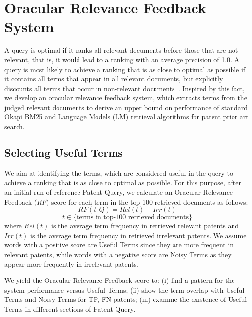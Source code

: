 \section{Oracular Relevance Feedback System}
\label{sec:oraculrquery}
A query is optimal if it ranks all relevant documents before
those that are not relevant, that is, it would lead to a ranking with an average precision of 1.0. A query
is most likely to achieve a ranking that is as close to optimal as possible if it contains all terms that
appear in all relevant documents, but explicitly discounts all terms that occur in non-relevant documents~\citep{manning2008introduction}.
Inspired by this fact, we develop an oracular relevance feedback system, which
extracts terms from the judged relevant documents to derive an upper bound on performance of
standard Okapi BM25 and Language Models (LM) retrieval
algorithms for patent prior art search.
\subsection{Selecting Useful Terms}
\label{OracularTermSelection}
We aim at identifying the terms, which are considered useful in the query to achieve a ranking that is as close to optimal as possible. For this purpose, 
after an initial run of reference Patent Query, we
calculate an Oracular Relevance Feedback ($\mathit{RF}$) score for each term in the top-100
retrieved documents as follows:
\begin{equation}
RF(t,Q)=Rel(t)-Irr(t) 
 \label{eq:score}
\end{equation}
\begin{displaymath}t\in \lbrace \mbox{terms in top-100 retrieved documents}\rbrace\end{displaymath}
where $ \mathit{Rel(t)} $ is the average term frequency in retrieved relevant patents and $ \mathit{Irr(t)} $ is the average term frequency in retrieved irrelevant patents. We assume words with a positive score are Useful Terms since they are more frequent in relevant patents, while words with a negative score are Noisy Terms as they appear more frequently in irrelevant patents. 

We yield the Oracular Relevance Feedback score to: (i) find a pattern for the system performance versus Useful Terms; (ii) show the term overlap with Useful Terms and Noisy Terms for TP, FN patents; (iii)  examine the existence of Useful Terms in different sections of Patent Query.

